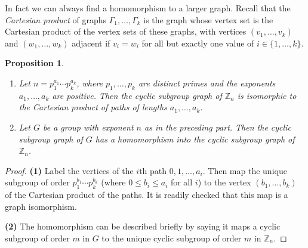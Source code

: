 \documentclass[11pt,twoside]{amsart}
\def \Z {{\mathbb{Z}}}
\def \Ga {{\Gamma }}
\newtheorem{pro}[theorem]{Proposition}
\begin{document}
In fact we can always find a homomorphism to a larger graph. Recall that the
\emph{Cartesian product} of graphs $\Gamma_1,\ldots,\Gamma_k$ is the graph
whose vertex set is the Cartesian product of the vertex sets of these graphs,
with vertices $(v_1,\ldots,v_k)$ and $(w_1,\ldots,w_k)$ adjacent if $v_i=w_i$
for all but exactly one value of $i\in\{1,\ldots,k\}$.

\begin{pro}
\begin{enumerate}
\item Let $n=p_1^{a_1}\cdots p_k^{a_k}$, where $p_1,\ldots,p_k$ are distinct
primes and the exponents $a_1,\ldots,a_k$ are positive.
Then the cyclic subgroup graph of $\Z_n$ is
isomorphic to the Cartesian product of paths of lengths $a_1,\ldots,a_k$.
\item Let $G$ be a group with exponent $n$ as in the preceding part. Then
the cyclic subgroup graph of $G$ has a homomorphism into the cyclic subgroup
graph of $\Z_n$.
\end{enumerate}
\end{pro}

\begin{proof}
\textbf{(1)} Label the vertices of the $i$th path $0,1,\ldots,a_i$. Then map the
unique subgroup of order $p_1^{b_1}\cdots p_k^{b_k}$
(where $0\le b_i\le a_i$ for all $i$) to the vertex $(b_1,\ldots,b_k)$ of
the Cartesian product of the paths. It is readily checked that this map
is a graph isomorphism.

\textbf{(2)} The homomorphism can be described briefly by saying it maps a cyclic
subgroup of order $m$ in $G$ to the unique cyclic subgroup of order $m$
in $\Z_n$.
\end{proof}

\end{document}

